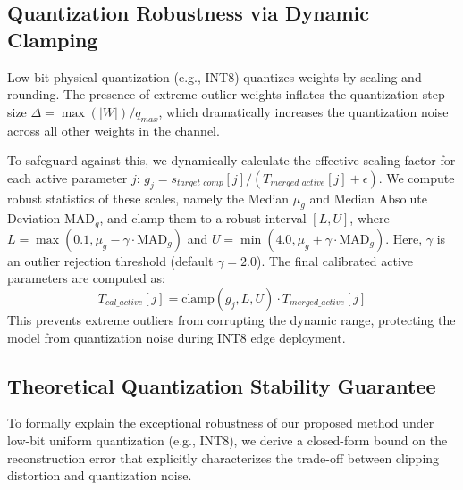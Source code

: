 \documentclass{article}
\theoremstyle{plain}
\theoremstyle{definition}
\theoremstyle{remark}
\begin{document}
\subsection{Quantization Robustness via Dynamic Clamping}
Low-bit physical quantization (e.g., INT8) quantizes weights by scaling and rounding. The presence of extreme outlier weights inflates the quantization step size $\Delta = \max(|W|) / q_{max}$, which dramatically increases the quantization noise across all other weights in the channel.

To safeguard against this, we dynamically calculate the effective scaling factor for each active parameter $j$: $g_j = s_{target\_comp}[j] / (T_{merged\_active}[j] + \epsilon)$. We compute robust statistics of these scales, namely the Median $\mu_{g}$ and Median Absolute Deviation $\text{MAD}_g$, and clamp them to a robust interval $[L, U]$, where $L = \max(0.1, \mu_g - \gamma \cdot \text{MAD}_g)$ and $U = \min(4.0, \mu_g + \gamma \cdot \text{MAD}_g)$. Here, $\gamma$ is an outlier rejection threshold (default $\gamma = 2.0$). The final calibrated active parameters are computed as:
\begin{equation}
    T_{cal\_active}[j] = \text{clamp}(g_j, L, U) \cdot T_{merged\_active}[j]
\end{equation}
This prevents extreme outliers from corrupting the dynamic range, protecting the model from quantization noise during INT8 edge deployment.

\subsection{Theoretical Quantization Stability Guarantee}
\label{subsec:quant_theory}
To formally explain the exceptional robustness of our proposed method under low-bit uniform quantization (e.g., INT8), we derive a closed-form bound on the reconstruction error that explicitly characterizes the trade-off between clipping distortion and quantization noise.
\end{document}
